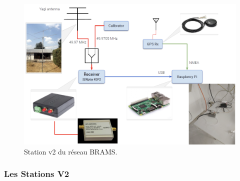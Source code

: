 \documentclass[11pt]{article}
\begin{document}
\begin{figure}[h]
    \begin{center}
        \includegraphics[scale=0.3]{schema_rsp2.png}
        \caption{Station v2 du réseau BRAMS.}
        \label{fig:station_rsp2}
    \end{center}
\end{figure}

\subsubsection{Les Stations V2}
\end{document}
